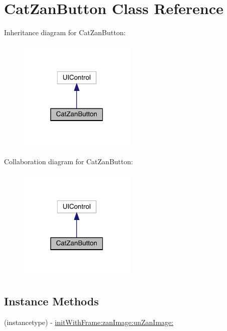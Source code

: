 \hypertarget{interface_cat_zan_button}{}\section{Cat\+Zan\+Button Class Reference}
\label{interface_cat_zan_button}


Inheritance diagram for Cat\+Zan\+Button\+:\nopagebreak
\begin{figure}[H]
\begin{center}
\leavevmode
\includegraphics[width=158pt]{interface_cat_zan_button__inherit__graph}
\end{center}
\end{figure}


Collaboration diagram for Cat\+Zan\+Button\+:\nopagebreak
\begin{figure}[H]
\begin{center}
\leavevmode
\includegraphics[width=158pt]{interface_cat_zan_button__coll__graph}
\end{center}
\end{figure}
\subsection*{Instance Methods}
\begin{DoxyCompactItemize}
\item 
(instancetype) -\/ \mbox{\hyperlink{interface_cat_zan_button_ab9556ea56d76bb6f11eb896c9f7d3def}{init\+With\+Frame\+:zan\+Image\+:un\+Zan\+Image\+:}}
\end{DoxyCompactItemize}
